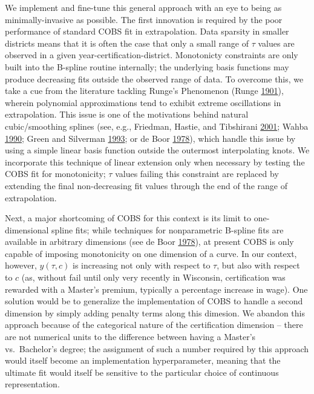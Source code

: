 \documentclass[12pt,]{article}
\begin{document}
We implement and fine-tune this general approach with an eye to being as
minimally-invasive as possible. The first innovation is required by the
poor performance of standard COBS fit in extrapolation. Data sparsity in
smaller districts means that it is often the case that only a small
range of \(\tau\) values are observed in a given
year-certification-district. Monotonicty constraints are only built into
the B-spline routine internally; the underlying basis functions may
produce decreasing fits outside the observed range of data. To overcome
this, we take a cue from the literature tackling Runge's Phenomenon
(Runge \protect\hyperlink{ref-runge}{1901}), wherein polynomial
approximations tend to exhibit extreme oscillations in extrapolation.
This issue is one of the motivations behind natural cubic/smoothing
splines (see, e.g., Friedman, Hastie, and Tibshirani
\protect\hyperlink{ref-friedman}{2001}; Wahba
\protect\hyperlink{ref-wahba}{1990}; Green and Silverman
\protect\hyperlink{ref-green}{1993}; or de Boor
\protect\hyperlink{ref-deboor}{1978}), which handle this issue by using
a simple linear basis function outside the outermost interpolating
knots. We incorporate this technique of linear extension only when
necessary by testing the COBS fit for monotonicity; \(\tau\) values
failing this constraint are replaced by extending the final
non-decreasing fit values through the end of the range of extrapolation.

Next, a major shortcoming of COBS for this context is its limit to
one-dimensional spline fits; while techniques for nonparametric B-spline
fits are available in arbitrary dimensions (see de Boor
\protect\hyperlink{ref-deboor}{1978}), at present COBS is only capable
of imposing monotonicity on one dimension of a curve. In our context,
however, \(y(\tau, c)\) is increasing not only with respect to \(\tau\),
but also with respect to \(c\) (as, without fail until only very
recently in Wisconsin, certification was rewarded with a Master's
premium, typically a percentage increase in wage). One solution would be
to generalize the implementation of COBS to handle a second dimension by
simply adding penalty terms along this dimesion. We abandon this
approach because of the categorical nature of the certification
dimension -- there are not numerical units to the difference between
having a Master's vs.~Bachelor's degree; the assignment of such a number
required by this approach would itself become an implementation
hyperparameter, meaning that the ultimate fit would itself be sensitive
to the particular choice of continuous representation.
\end{document}

